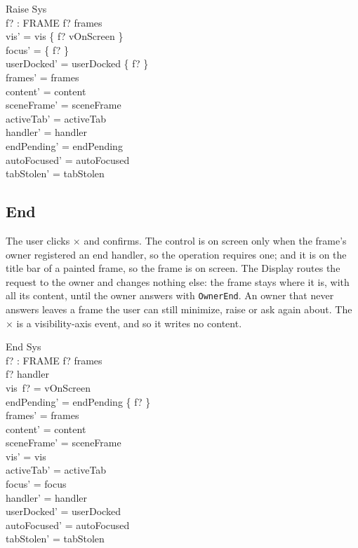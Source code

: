 \documentclass[a4paper,10pt,fleqn]{article}
\begin{document}
\begin{schema}{Raise}
  \Delta Sys \\
  f? : FRAME
\where
  f? \in frames \\
  vis' = vis \oplus \{ f? \mapsto vOnScreen \} \\
  focus' = \{ f? \} \\
  userDocked' = userDocked \setminus \{ f? \} \\
  frames' = frames \\
  content' = content \\
  sceneFrame' = sceneFrame \\
  activeTab' = activeTab \\
  handler' = handler \\
  endPending' = endPending \\
  autoFocused' = autoFocused \\
  tabStolen' = tabStolen
\end{schema}

\subsection{End}

The user clicks $\times$ and confirms.  The control is on screen only when the
frame's owner registered an end handler, so the operation requires one; and it
is on the title bar of a painted frame, so the frame is on screen.  The
Display routes the request to the owner and changes nothing else: the frame
stays where it is, with all its content, until the owner answers with
\texttt{OwnerEnd}.  An owner that never answers leaves a frame the user can
still minimize, raise or ask again about.  The $\times$ is a visibility-axis
event, and so it writes no content.

\begin{schema}{End}
  \Delta Sys \\
  f? : FRAME
\where
  f? \in frames \\
  f? \in handler \\
  vis~f? = vOnScreen \\
  endPending' = endPending \cup \{ f? \} \\
  frames' = frames \\
  content' = content \\
  sceneFrame' = sceneFrame \\
  vis' = vis \\
  activeTab' = activeTab \\
  focus' = focus \\
  handler' = handler \\
  userDocked' = userDocked \\
  autoFocused' = autoFocused \\
  tabStolen' = tabStolen
\end{schema}
\end{document}
